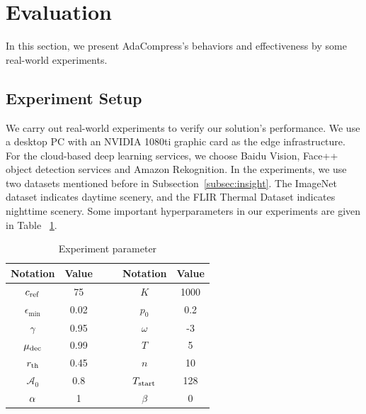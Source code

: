 \section{Evaluation}
\label{Section: evaluation}

In this section, we present AdaCompress's behaviors and effectiveness by some real-world experiments. %

\subsection{Experiment Setup}

We carry out real-world experiments to verify our solution's performance. We use a desktop PC with an NVIDIA 1080ti graphic card as the edge infrastructure. For the cloud-based deep learning services, we choose Baidu Vision, Face++ object detection services and Amazon Rekognition. In the experiments, we use two datasets mentioned before in Subsection~\ref{subsec:insight}. The ImageNet dataset indicates daytime scenery, and the FLIR Thermal Dataset indicates nighttime scenery. Some important hyperparameters in our experiments are given in Table ~\ref{tab: parameters}.

\begin{table}[!t]
	\centering
	\caption{Experiment parameter}
	\label{tab: parameters}
	\begin{tabular}{cccccc}
		\toprule
		Notation          & Value & & & Notation     & Value  \\ \midrule
		$c_{\rm ref}$ & 75    & & & $K$      & 1000   \\
		$\epsilon_{\min}$    & 0.02  & & & $p_0$    & 0.2    \\
		$\gamma$      & 0.95  & & & $\omega$ & -3   \\
		$ \mu_{\rm dec} $ & 0.99 & & & $ T $ & 5  \\
		$r_{\rm th}$  & 0.45   & & &   $ n  $  &  10      \\ 
		{\color{revise} $ \mathcal{A}_0 $} & {\color{revise}0.8} & & & {\color{revise}$ T_{\rm start} $} & {\color{revise}128} \\
		$ {\color{revise}\alpha} $ & {\color{revise}1} & & & {\color{revise}$ \beta $} & {\color{revise}0}  \\ \bottomrule
	\end{tabular}
\end{table}

